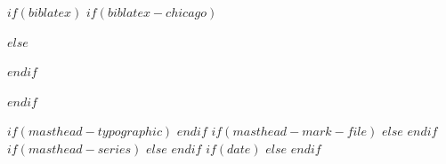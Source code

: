 \renewcommand{\epigraphsize}{\sffamily\footnotesize}
\setlength{\epigraphrule}{0em}
\setlength{\beforeepigraphskip}{-2em}
\setlength{\afterepigraphskip}{1em}

$if(biblatex)$
$if(biblatex-chicago)$
\usepackage[$if(biblio-style)$$biblio-style$,$endif$$for(biblatexoptions)$$biblatexoptions$$sep$,$endfor$]{biblatex-chicago}
$else$
\usepackage[$if(biblio-style)$style=$biblio-style$,$endif$$for(biblatexoptions)$$biblatexoptions$$sep$,$endfor$]{biblatex}
$endif$

\setlength\bibitemsep{0pt}  %
\renewcommand*{\bibfont}{\footnotesize}  %
\setlength\bibhang{\parindent}  %



$endif$

\newif\ifssusmark
\ssusmarktrue
$if(masthead-typographic)$
\ssusmarkfalse
$endif$
$if(masthead-mark-file)$
\def\ssusmarkfile{$masthead-mark-file$}
$else$
\def\ssusmarkfile{$ssus-masthead-assets$ssus-mark-light.pdf}  %
$endif$
$if(masthead-series)$
\def\ssusseries{$masthead-series$}
$else$
\def\ssusseries{SSUS working paper series}
$endif$
$if(date)$
\def\ssusdate{$date$}
$else$
\def\ssusdate{\today}
$endif$